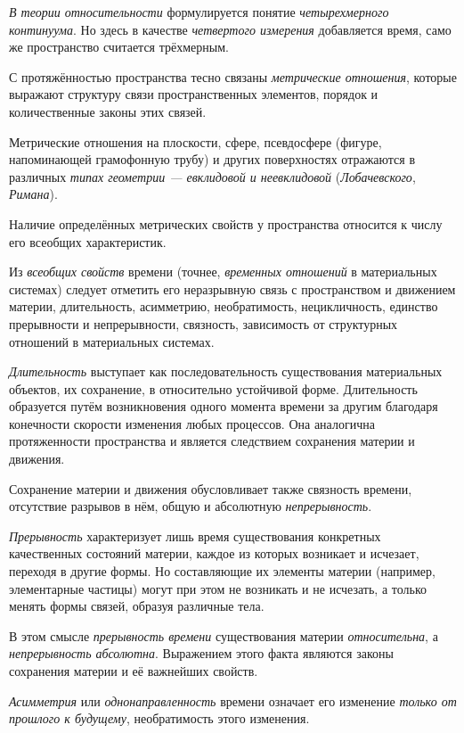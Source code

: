 \documentclass[a4paper,14pt,russian]{extreport}
\begin{document}
\emph{В теории относительности} формулируется понятие \emph{четырехмерного континуума}. Но здесь в качестве \emph{четвертого измерения} добавляется время, само же пространство считается трёхмерным.

С протяжённостью пространства тесно связаны \emph{метрические отношения}, которые выражают структуру связи пространственных элементов, порядок и количественные законы этих связей.

Метрические отношения на плоскости, сфере, псевдосфере (фигуре, напоминающей грамофонную трубу) и других поверхностях отражаются в различных \emph{типах геометрии --- евклидовой и неевклидовой} (\emph{Лобачевского}, \emph{Римана}).

Наличие определённых метрических свойств у пространства относится к числу его всеобщих характеристик.

Из \emph{всеобщих свойств} времени (точнее, \emph{временных отношений} в материальных системах) следует отметить его неразрывную связь с пространством и движением материи, длительность, асимметрию, необратимость, нецикличность, единство прерывности и непрерывности, связность, зависимость от структурных отношений в материальных системах.

\emph{Длительность} выступает как последовательность существования материальных объектов, их сохранение, в относительно устойчивой форме. Длительность образуется путём возникновения одного момента времени за другим благодаря конечности скорости изменения любых процессов. Она аналогична протяженности пространства и является следствием сохранения материи и движения.

Сохранение материи и движения обусловливает также связность времени, отсутствие разрывов в нём, общую и абсолютную \emph{непрерывность}.

\emph{Прерывность} характеризует лишь время существования конкретных качественных состояний материи, каждое из которых возникает и исчезает, переходя в другие формы. Но составляющие их элементы материи (например, элементарные частицы) могут при этом не возникать и не исчезать, а только менять формы связей, образуя различные тела.

В этом смысле \emph{прерывность времени} существования материи \emph{относительна}, а \emph{непрерывность абсолютна}. Выражением этого факта являются законы сохранения материи и её важнейших свойств.

\emph{Асимметрия} или \emph{однонаправленность} времени означает его изменение \emph{только от прошлого к будущему}, необратимость этого изменения.
\end{document}
